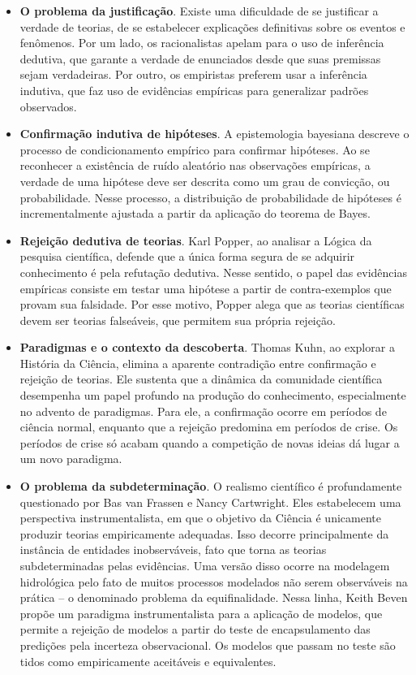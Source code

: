\documentclass[./main.tex]{subfiles}
\begin{document}
\begin{itemize}
    \item[$\blacksquare$] \textbf{O problema da justificação}. Existe uma dificuldade de se justificar a verdade de teorias, de se estabelecer explicações definitivas sobre os eventos e fenômenos. Por um lado, os racionalistas apelam para o uso de inferência dedutiva, que garante a verdade de enunciados desde que suas premissas sejam verdadeiras. Por outro, os empiristas preferem usar a inferência indutiva, que faz uso de evidências empíricas para generalizar padrões observados.
    \item  [$\blacksquare$] \textbf{Confirmação indutiva de hipóteses}. A epistemologia bayesiana descreve o processo de condicionamento empírico para confirmar hipóteses. Ao se reconhecer a existência de ruído aleatório nas observações empíricas, a verdade de uma hipótese deve ser descrita como um grau de convicção, ou probabilidade. Nesse processo, a distribuição de probabilidade de hipóteses é incrementalmente ajustada a partir da aplicação do teorema de Bayes. 
    \item[$\blacksquare$] \textbf{Rejeição dedutiva de teorias}. Karl Popper, ao analisar a Lógica da pesquisa científica, defende que a única forma segura de se adquirir conhecimento é pela refutação dedutiva. Nesse sentido, o papel das evidências empíricas consiste em testar uma hipótese a partir de contra-exemplos que provam sua falsidade. Por esse motivo, Popper alega que as teorias científicas devem ser teorias falseáveis, que permitem sua própria rejeição.  
    \item     [$\blacksquare$] \textbf{Paradigmas e o contexto da descoberta}. Thomas Kuhn, ao explorar a História da Ciência, elimina a aparente contradição entre confirmação e rejeição de teorias. Ele sustenta que a dinâmica da comunidade científica desempenha um papel profundo na produção do conhecimento, especialmente no advento de paradigmas. Para ele, a confirmação ocorre em períodos de ciência normal, enquanto que a rejeição predomina em períodos de crise. Os períodos de crise só acabam quando a competição de novas ideias dá lugar a um novo paradigma.
    \item[$\blacksquare$] \textbf{O problema da subdeterminação}. O realismo científico é profundamente questionado por Bas van Frassen e Nancy Cartwright. Eles estabelecem uma perspectiva instrumentalista, em que o objetivo da Ciência é unicamente produzir teorias empiricamente adequadas. Isso decorre principalmente da instância de entidades inobserváveis, fato que torna as teorias subdeterminadas pelas evidências. Uma versão disso ocorre na modelagem hidrológica pelo fato de muitos processos modelados não serem observáveis na prática -- o denominado problema da equifinalidade. Nessa linha, Keith Beven propõe um paradigma instrumentalista para a aplicação de modelos, que permite a rejeição de modelos a partir do teste de encapsulamento das predições pela incerteza observacional. Os modelos que passam no teste são tidos como empiricamente aceitáveis e equivalentes.  
\end{itemize}
\end{document}
